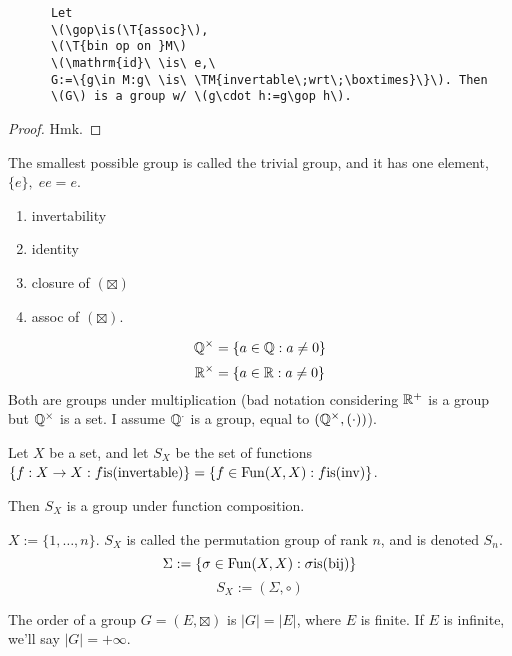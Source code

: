 \documentclass[12pt]{article}
\newcommand{\gop}[0]{\boxtimes}
\begin{document}
\bbox
\begin{lem}
    \begin{verbatim}
      Let 
      \(\gop\is(\T{assoc}\),
      \(\T{bin op on }M\)
      \(\mathrm{id}\ \is\ e,\ 
      G:=\{g\in M:g\ \is\ \TM{invertable\;wrt\;\boxtimes}\}\). Then
      \(G\) is a group w/ \(g\cdot h:=g\gop h\).
    \end{verbatim}
\end{lem}
\ebox

\bboxproof
\begin{proof}
  Hmk.
\end{proof}
\ebox

The smallest possible group is called the trivial group, and it has one
element, \(\{e\},\;ee=e\).

\begin{enumerate}
  \item invertability
  \item identity
  \item closure of \((\gop)\)
  \item assoc of \((\gop)\).
\end{enumerate}


\bboxex
\[\mathbb Q^\times=\{a\in\mathbb Q:a\neq0\}\]
\[\mathbb R^\times=\{a\in\mathbb R:a\neq0\}\]
Both are groups under multiplication (bad notation considering \(\mathbb R^+\)
is a group but \(\mathbb Q^\times\) is a set. I assume \(\mathbb Q^\cdot\) is a group, equal
to \((\mathbb Q^\times,(\cdot))\)).
\ebox

\bbox
\begin{coro}
  Let \(X\) be a set, and let \(S_X\) be the set of functions
  \(\{f:X\to X:f\mathrm{is}(\mathrm{invertable})\}=\{f\in\mathrm{Fun}(X,X):f\mathrm{is}(\mathrm{inv})\}\).

  Then \(S_X\) is a group under function composition.
\end{coro}
\ebox

\bbox
\begin{defn}[Permutation Group]\label{defn:perm_group}
  \(X:=\{1,\dots,n\}\). \(S_X\) is called the permutation group of rank \(n\),
  and is denoted \(S_n\).
  \bboxnote
  \[\Sigma:=\{\sigma\in\mathrm{Fun}(X,X):\sigma\mathrm{is}(\mathrm{bij})\}\]
  \[S_X:=(\Sigma,\circ)\]
  \ebox
\end{defn}
\ebox

\bbox
\begin{defn}[Order]\label{defn:order}
  The order of a group \(G=(E,\gop)\) is \(|G|=|E|\), where \(E\) is finite. If
  \(E\) is infinite, we'll say \(|G|=+\infty\).
\end{defn}
\ebox
\end{document}
